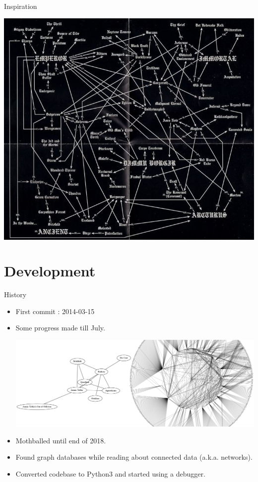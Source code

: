\documentclass{beamer}
\begin{document}
    \begin{frame}{Inspiration}
      \begin{center}
        \includegraphics[scale=2.3]{true_kings_diagram}
      \end{center}
    \end{frame}

\section{Development}

    \begin{frame}{History}

      \begin{itemize}

        \item<1-> First commit : 2014-03-15
        \item<1-> Some progress made till July.
          \begin{center}
            \includegraphics[scale=.6]{bandsGraphCombined}
          \end{center}
        \item<2-> Mothballed until end of 2018.
        \item<2-> Found graph databases while reading about connected data
          (a.k.a. networks).
        \item<2-> Converted codebase to Python3 and started using a debugger.
      \end{itemize}

    \end{frame}
\end{document}
